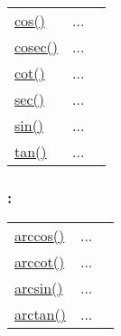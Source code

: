 \textcolor{blue}{}\begin{tabular}{>{\raggedleft}p{3cm}>{\centering}p{0.5cm}l}
\textcolor{blue}{\hyperlink{cos}{cos()}}&
...&
 \begin{NoHyper} \nameref{par:Cosine} \end{NoHyper}\tabularnewline
\textcolor{blue}{\hyperlink{cosec}{cosec()}}&
...&
 \begin{NoHyper} \nameref{par:Cosecant} \end{NoHyper}\tabularnewline
\textcolor{blue}{\hyperlink{cot}{cot()}}&
...&
 \begin{NoHyper} \nameref{par:Cotangent} \end{NoHyper}\tabularnewline
\textcolor{blue}{\hyperlink{sec}{sec()}}&
...&
 \begin{NoHyper} \nameref{par:Secant} \end{NoHyper}\tabularnewline
\textcolor{blue}{\hyperlink{sin}{sin()}}&
...&
 \begin{NoHyper} \nameref{par:Sine} \end{NoHyper}\tabularnewline
\textcolor{blue}{\hyperlink{tan}{tan()}}&
...&
 \begin{NoHyper} \nameref{par:Tangent} \end{NoHyper}\tabularnewline
\end{tabular}


\subsubsection*{: }

\textcolor{blue}{}\begin{tabular}{>{\raggedleft}p{3cm}>{\centering}p{0.5cm}l}
\textcolor{blue}{\hyperlink{arccos}{arccos()}}&
...&
 \begin{NoHyper} \nameref{par:Arc-cosine} \end{NoHyper}\tabularnewline
\textcolor{blue}{\hyperlink{arccot}{arccot()}}&
...&
 \begin{NoHyper} \nameref{par:Arc-cotangent} \end{NoHyper}\tabularnewline
\textcolor{blue}{\hyperlink{arcsin}{arcsin()}}&
...&
 \begin{NoHyper} \nameref{par:Arc-sine} \end{NoHyper}\tabularnewline
\textcolor{blue}{\hyperlink{arctan}{arctan()}}&
...&
 \begin{NoHyper} \nameref{par:Arc-tangent} \end{NoHyper}\tabularnewline
\end{tabular}


